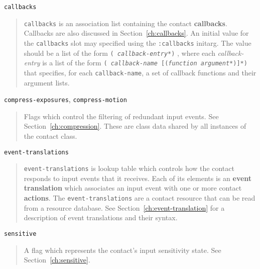 \documentclass[twoside]{book}
\begin{document}
\begin{sloppy}
\begin{flushright} \parbox[t]{6.125in}{
{\tt callbacks}
\begin{quote}
{\tt callbacks} is an association list containing the contact
{\bf callbacks}.
Callbacks are also discussed in
Section~\ref{ch:callbacks}. 	An initial value for the {\tt callbacks} slot may
	specified using the {\tt :callbacks}
	initarg. The value should be a list of the form {\tt ({\em
	callback-entry}*)} ,
	where each {\em callback-entry} is a list of the form {\tt ({\em
	callback-name} [({\em function}
	{\em argument}*)]*)} that specifies, for each {\tt callback-name}, a set
	of callback functions and their argument lists.
\end{quote}

}\end{flushright}


\begin{flushright} \parbox[t]{6.125in}{
{\tt compress-exposures}, {\tt compress-motion}
\begin{quote}
Flags which control the filtering of redundant input events. See
Section~\ref{ch:compression}. 
These are class data shared by all instances of the contact class.
 \end{quote}

}\end{flushright}



\begin{flushright} \parbox[t]{6.125in}{
{\tt event-translations}
\begin{quote}
{\tt event-translations} is lookup table which controls how the contact
responds to input events that it receives. Each of its elements
is an {\bf event translation} which associates
an input event with one or more contact {\bf actions}. The
{\tt event-translations} are a contact resource that can be read from a
resource database. 
See Section~\ref{ch:event-translation} for
a description of event translations and their syntax. 
\end{quote}

}\end{flushright}


\begin{flushright} \parbox[t]{6.125in}{
{\tt sensitive}
\begin{quote}
A flag which represents the contact's input sensitivity state. See
Section~\ref{ch:sensitive}. \end{quote}

}
\end{flushright}
\end{sloppy}
\end{document}

